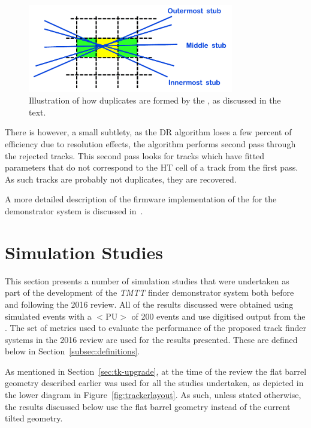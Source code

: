 \begin{figure}[!h]
\centering
\includegraphics[width=0.80\textwidth]{figs/tk-upgrade/A50_algo.pdf}
\caption{Illustration of how duplicates are formed by the \rphi \HT, as discussed in the text.}
\label{fig:DR}
\end{figure}

There is however, a small subtlety, as the DR algorithm loses a few percent of efficiency due to resolution effects, the algorithm performs second pass through the rejected tracks.
This second pass looks for tracks which have fitted parameters that do not correspond to the HT cell of a track from the first pass.
As such tracks are probably not duplicates, they are recovered.

A more detailed description of the firmware implementation of the \DR for the demonstrator system is discussed in~\cite{TMTT_JINST}.

\section{Simulation Studies}\label{sec:TmttSimStudies}
This section presents a number of simulation studies that were undertaken as part of the development of the \emph{TMTT} finder demonstrator system both before and following the 2016 review.
All of the results discussed were obtained using simulated \ttbar events with a $<\textrm{PU}>$ of 200 events and use digitised output from the \HT.
The set of metrics used to evaluate the performance of the proposed track finder systems in the 2016 review are used for the results presented.
These are defined below in Section~\ref{subsec:definitions}.

As mentioned in Section~\ref{sec:tk-upgrade}, at the time of the review the flat barrel geometry described earlier was used for all the studies undertaken, as depicted in the lower diagram in Figure~\ref{fig:trackerlayout}.
As such, unless stated otherwise, the results discussed below use the flat barrel geometry instead of the current tilted geometry.

